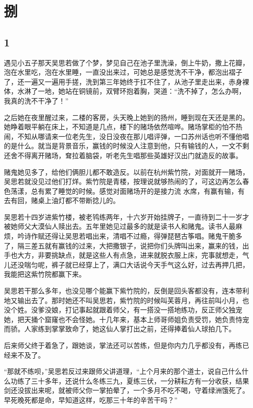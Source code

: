 \section{捌}

{\centering\subsection{1}}

遇见小五子那天吴思若做了个梦，梦见自己在池子里洗澡，倒上牛奶，撒上花瓣，泡在水里吃，泡在水里睡，一直没出来过，可她总是感觉洗不干净，都泡出褶子了，还一遍又一遍用手搓，洗到第三年她终于扛不住了，从池子里走出来，赤身裸体，水淋了一地，她站在铜镜前，双臂环抱着胸，哭道：“洗不掉了，怎么办啊，我真的洗不干净了！”

之后她在夜里醒过来，二楼的客房，头天晚上她到的扬州，睡到现在天还是黑的。她睁着眼平躺在床上，不知道是几点，楼下的赌场依然喧哗。赌场掌柜的怕不热闹，不知从哪请来一位老先生，没日没夜在那儿唱评弹，一口苏州话也听不懂他唱的是什么。就当是背景音乐，赢钱的时候没人注意到他，只有输钱的人，一文不剩还舍不得离开赌场，耷拉着脑袋，听老先生唱那些英雄好汉出门就造反的故事。

赌鬼她见多了，给他们俩胆儿都不敢造反。以前在杭州紫竹院，对面就开一赌场，吴思若就没见过他们打烊。紫竹院是青楼，按理说就够热闹的了，可这边再怎么春色荡漾，总有累了睡觉的时候。感觉对面赌场开的是接力流
水席，有赢有输，有去有回，赌桌上油灯都不带断捻儿的。

吴思若十四岁进紫竹楼，被老鸨练两年，十六岁开始挂牌子，一直待到二十一岁才被她师父大漠仙人赎出去。五年里她见过最多的就是读书人和赌鬼。读书人最麻烦，吟诗作赋还得让吴思若唱出来，清唱不过瘾，得弹琵琶古筝唱。赌鬼干脆多了，隔三差五就有赢钱的过来，大把撒银子，说把你们头牌叫出来，赢来的钱，出手也大方，非要挑缺点，就是这些人有点急，进来就脱衣服上床，完事就想走，气儿还没喘匀呢，裤子就已经穿上了，满口大话说今天手气这么好，过去再押几把，我能把这紫竹院都赢下来。

吴思若干那么多年，也没见哪个能赢下紫竹院的，反倒是回头客都没有，连本带利地又输出去了。那时她还不叫吴思若，紫竹院的时候叫芙蓉月，再往前叫小月，也没个姓。没爹没娘，打记事起就跟着师父，有一搭没一搭地练功，反正师父独宠她，把天捅个窟窿也不会怪她。十几年来，基本上师哥师姐负责受罚，她负责恃宠而骄。人家练到掌掌致命了，她这仙人掌打出之前，还得捧着仙人球拍几下。

后来师父终于着急了，跟她谈，掌法还可以苦练，但是你内力几乎都没有，再练已经来不及了。

“那就不练呗，”吴思若反过来跟师父讲道理，“上个月来的那个道士，说自己什么什么功练了三十多年，还说什么冬练三九，夏练三伏，一分耕耘方有一分收获，结果剑还没拔出来呢，就被师父你一掌拍晕了，一个多月不吃不喝，守着绿洲饿死了。早死晚死都是命，早知道这样，吃那三十年的辛苦干吗？”

